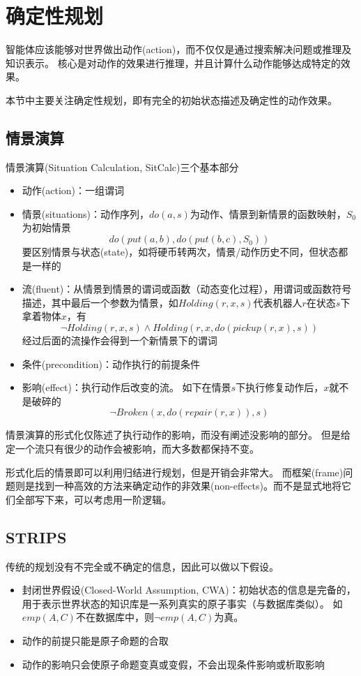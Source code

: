 
\section{确定性规划}
智能体应该能够对世界做出动作(action)，而不仅仅是通过搜索解决问题或推理及知识表示。
核心是对动作的效果进行推理，并且计算什么动作能够达成特定的效果。

本节中主要关注确定性规划，即有完全的初始状态描述及确定性的动作效果。

\subsection{情景演算}
情景演算(Situation Calculation, SitCalc)三个基本部分
\begin{itemize}
	\item 动作(action)：一组谓词
	\item 情景(situations)：动作序列，$do(a,s)$为动作、情景到新情景的函数映射，$S_0$为初始情景
	\[do(put(a,b),do(put(b,c),S_0))\]
	要区别情景与状态(state)，如将硬币转两次，情景/动作历史不同，但状态都是一样的
	\item 流(fluent)：从情景到情景的谓词或函数（动态变化过程），用谓词或函数符号描述，其中最后一个参数为情景，如$Holding(r,x,s)$代表机器人$r$在状态$s$下拿着物体$x$，有
	\[\lnot Holding(r,x,s)\land Holding(r,x,do(pickup(r,x),s))\]
	经过后面的流操作会得到一个新情景下的谓词
	\item 条件(precondition)：动作执行的前提条件
	\item 影响(effect)：执行动作后改变的流。 %
	如下在情景$s$下执行修复动作后，$x$就不是破碎的
	\[\lnot Broken(x,do(repair(r,x)),s)\]
\end{itemize}

情景演算的形式化仅陈述了执行动作的影响，而没有阐述没影响的部分。
但是给定一个流只有很少的动作会被影响，而大多数都保持不变。

形式化后的情景即可以利用归结进行规划，但是开销会非常大。
而框架(frame)问题则是找到一种高效的方法来确定动作的非效果(non-effects)。而不是显式地将它们全部写下来，可以考虑用一阶逻辑。

\subsection{STRIPS}
传统的规划没有不完全或不确定的信息，因此可以做以下假设。
\begin{itemize}
	\item 封闭世界假设(Closed-World Assumption, CWA)：初始状态的信息是完备的，用于表示世界状态的知识库是一系列真实的原子事实（与数据库类似）。
	如$emp(A,C)$不在数据库中，则$\lnot emp(A,C)$为真。
	\item 动作的前提只能是原子命题的合取
	\item 动作的影响只会使原子命题变真或变假，不会出现条件影响或析取影响
\end{itemize}

